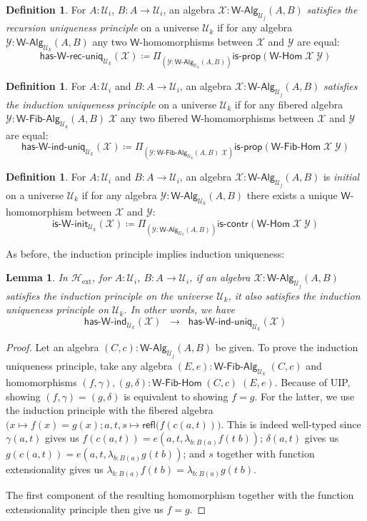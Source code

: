 \documentclass[11pt]{article}
\newcommand{\X}{\mathcal{X}}
\newcommand{\Y}{\mathcal{Y}}
\newcommand{\prd}[1]{\Pi_{#1}}
\newcommand{\lam}[1]{\lambda_{#1}}
\newcommand{\defeq}{\coloneqq}
\newcommand{\refl}{\mathsf{refl}}
\newcommand{\W}{\mathsf{W}}
\newcommand{\UU}{\mathcal{U}}
\newcommand{\WAlg}{\mathsf{W}\text{-}\mathsf{Alg}}
\newcommand{\WFibAlg}{\mathsf{W}\text{-}\mathsf{Fib}\text{-}\mathsf{Alg}}
\newcommand{\WHom}{\mathsf{W}\text{-}\mathsf{Hom}}
\newcommand{\WFibHom}{\mathsf{W}\text{-}\mathsf{Fib}\text{-}\mathsf{Hom}}
\newcommand{\HasWInd}{\mathsf{has}\text{-}\mathsf{W}\text{-}\mathsf{ind}}
\newcommand{\HasWRecUniq}{\mathsf{has}\text{-}\mathsf{W}\text{-}\mathsf{rec}\text{-}\mathsf{uniq}}
\newcommand{\HasWIndUniq}{\mathsf{has}\text{-}\mathsf{W}\text{-}\mathsf{ind}\text{-}\mathsf{uniq}}
\newcommand{\IsWInit}{\mathsf{is}\text{-}\mathsf{\W}\text{-}\mathsf{init}}
\newcommand{\iscontr}{\mathsf{is}\text{-}\mathsf{contr}}
\newcommand{\isprop}{\mathsf{is}\text{-}\mathsf{prop}}
\newcommand{\Hext}{\mathcal{H}_{\mathrm{ext}}}
\newtheorem{lemma}[theorem]{Lemma}
\theoremstyle{definition}
\newtheorem{definition}[theorem]{Definition}
\begin{document}
\begin{definition}\label{def:WRecUniq}
For $A:\UU_i$, $B : A \to \UU_i$, an algebra $\X : \WAlg_{\UU_j}(A,B)$ \emph{satisfies the recursion uniqueness principle} on a universe $\UU_k$ if for any algebra $\Y : \WAlg_{\UU_k}(A,B)$
any two $\W$-homomorphisms between $\X$ and $\Y$ are equal:
\[ \HasWRecUniq_{\UU_k}(\X) \defeq \prd{(\Y:\WAlg_{\UU_k}(A,B))} \isprop(\WHom \; \X \; \Y) \]
\end{definition}

\begin{definition}\label{def:WIndUniq}
For $A:\UU_i$ and $B : A \to \UU_i$, an algebra $\X : \WAlg_{\UU_j}(A,B)$ \emph{satisfies the induction uniqueness principle} on a universe $\UU_k$ if for any fibered algebra $\Y : \WFibAlg_{\UU_k}(A,B) \; \X$ any two fibered $\W$-homomorphisms between $\X$ and $\Y$ are equal:
\[ \HasWIndUniq_{\UU_k}(\X) \defeq \prd{(\Y:\WFibAlg_{\UU_k}(A,B) \; \X)} \isprop(\WFibHom \; \X \; \Y) \]
\end{definition}

\begin{definition}\label{def:WInit}
For $A:\UU_i$ and $B : A \to \UU_i$, an algebra $\X : \WAlg_{\UU_j}(A,B)$ is \emph{initial} on a universe $\UU_k$ if for any algebra $\Y : \WAlg_{\UU_k}(A,B)$ there exists a unique $\W$-homomorphism between $\X$ and $\Y$:
\[ \IsWInit_{\UU_k}(\X) \defeq \prd{(\Y:\WAlg_{\UU_k}(A,B))} \iscontr(\WHom \; \X \; \Y) \]  
\end{definition}

As before, the induction principle implies induction uniqueness:

\begin{lemma}\label{lem:WIndImpUniq}
In $\Hext$, for $A:\UU_i$, $B : A \to \UU_i$, if an algebra $\X : \WAlg_{\UU_j}(A,B)$ satisfies the induction principle on the universe $\UU_k$, it also satisfies the induction uniqueness principle on $\UU_k$. In other words, we have
\[ \HasWInd_{\UU_k}(\X) \;\; \rightarrow \;\; \HasWIndUniq_{\UU_k}(\X) \]
\end{lemma}
\begin{proof}
Let an algebra $(C,c) : \WAlg_{\UU_j}(A,B)$ be given. To prove the induction uniqueness principle, take any algebra $(E,e) : \WFibAlg_{\UU_k} \; (C,c)$ and homomorphisms $(f,\gamma), (g,\delta) : \WFibHom \; (C,c) \; (E,e)$. Because of UIP, showing $(f,\gamma) = (g,\delta)$ is equivalent to showing $f = g$. For the latter, we use the induction principle with the fibered algebra $\big(x \mapsto f(x) = g(x); a,t,s \mapsto \refl(f(c(a,t)) \big)$. This is indeed well-typed since $\gamma(a,t)$ gives us $f(c(a,t)) = e(a,t,\lam{b:B(a)} f(t\;b))$; $\delta(a,t)$ gives us $g(c(a,t)) = e(a,t,\lam{b:B(a)} g(t\;b))$; and $s$ together with function extensionality gives us
$\lam{b:B(a)} f(t\;b) = \lam{b:B(a)} g(t\;b)$.

The first component of the resulting homomorphism together with the function extensionality principle then give us $f = g$.
\end{proof}
\end{document}
